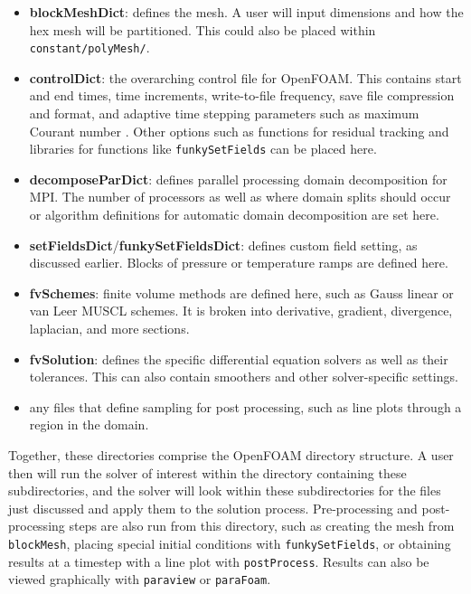 \begin{itemize}
    \item \textbf{blockMeshDict}: defines the mesh. A user will input dimensions and how the hex mesh will be partitioned. This could also be placed within \verb|constant/polyMesh/|. 
    \item \textbf{controlDict}: the overarching control file for OpenFOAM. This contains start and end times, time increments, write-to-file frequency, save file compression and format, and adaptive time stepping parameters such as maximum Courant number \cite{courant}. Other options such as functions for residual tracking and libraries for functions like \verb|funkySetFields| can be placed here. 
    \item \textbf{decomposeParDict}: defines parallel processing domain decomposition for MPI. The number of processors as well as where domain splits should occur or algorithm definitions for automatic domain decomposition are set here. 
    \item \textbf{setFieldsDict}/\textbf{funkySetFieldsDict}: defines custom field setting, as discussed earlier. Blocks of pressure or temperature ramps are defined here. 
    \item \textbf{fvSchemes}: finite volume methods are defined here, such as Gauss linear or van Leer MUSCL schemes. It is broken into derivative, gradient, divergence, laplacian, and more sections. 
    \item \textbf{fvSolution}: defines the specific differential equation solvers as well as their tolerances. This can also contain smoothers and other solver-specific settings. 
    \item any files that define sampling for post processing, such as line plots through a region in the domain.  
\end{itemize}

Together, these directories comprise the OpenFOAM directory structure. A user then will run the solver of interest within the directory containing these subdirectories, and the solver will look within these subdirectories for the files just discussed and apply them to the solution process. Pre-processing and post-processing steps are also run from this directory, such as creating the mesh from \verb|blockMesh|, placing special initial conditions with \verb|funkySetFields|, or obtaining results at a timestep with a line plot with \verb|postProcess|. Results can also be viewed graphically with \verb|paraview| or \verb|paraFoam|. 

